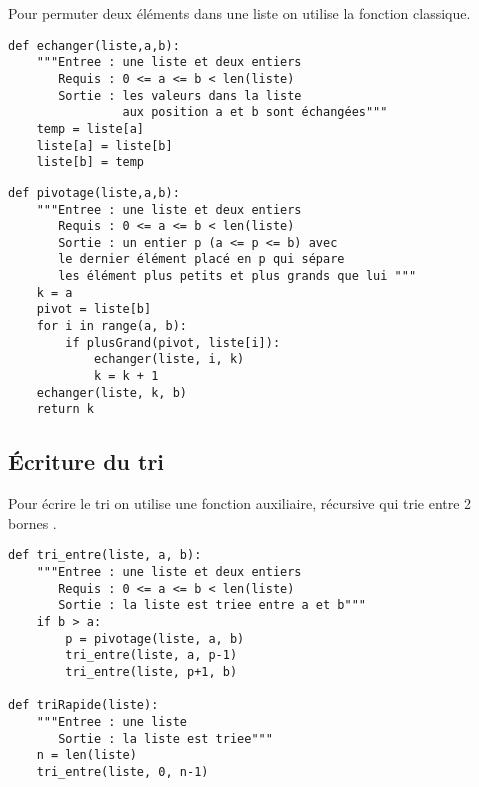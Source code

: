 \newpage
Pour permuter deux éléments dans une liste on utilise la fonction classique.
\begin{lstlisting}
def echanger(liste,a,b):
    """Entree : une liste et deux entiers
       Requis : 0 <= a <= b < len(liste)
       Sortie : les valeurs dans la liste
                aux position a et b sont échangées"""
    temp = liste[a]
    liste[a] = liste[b]
    liste[b] = temp
\end{lstlisting}
\begin{lstlisting}[caption = {Découpage pour le tri rapide},label={fn:separe}]
def pivotage(liste,a,b):
    """Entree : une liste et deux entiers
       Requis : 0 <= a <= b < len(liste)
       Sortie : un entier p (a <= p <= b) avec
       le dernier élément placé en p qui sépare
       les élément plus petits et plus grands que lui """
    k = a
    pivot = liste[b]
    for i in range(a, b):
        if plusGrand(pivot, liste[i]):
            echanger(liste, i, k)
            k = k + 1
    echanger(liste, k, b)
    return k
\end{lstlisting}
\subsection{Écriture du tri}
Pour écrire le tri on utilise une fonction auxiliaire, récursive qui trie entre 2 bornes .
\begin{lstlisting}[caption = {Tri rapide}]
def tri_entre(liste, a, b):
    """Entree : une liste et deux entiers
       Requis : 0 <= a <= b < len(liste)
       Sortie : la liste est triee entre a et b"""
    if b > a: 
        p = pivotage(liste, a, b)
        tri_entre(liste, a, p-1)
        tri_entre(liste, p+1, b)
        
def triRapide(liste):
    """Entree : une liste
       Sortie : la liste est triee"""
    n = len(liste)
    tri_entre(liste, 0, n-1)
\end{lstlisting}
\newpage
